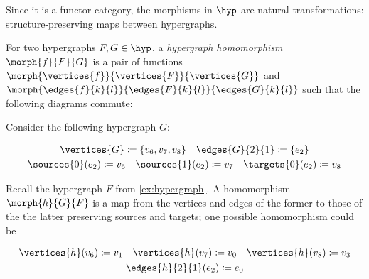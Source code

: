 Since it is a functor category, the morphisms in \(\hyp\) are natural
transformations: structure-preserving maps between hypergraphs.

\begin{definition}\label{def:hypergraph-homomorphism}
    For two hypergraphs \(F, G \in \hyp\), a \emph{hypergraph homomorphism}
    \(\morph{f}{F}{G}\) is a pair of functions
    \(\morph{\vertices{f}}{\vertices{F}}{\vertices{G}}\) and
    \(\morph{\edges{f}{k}{l}}{\edges{F}{k}{l}}{\edges{G}{k}{l}}\) such that the
    following diagrams commute:
    
\end{definition}
%
\begin{example}\label{ex:hypergraph-homomorphism}
    Consider the following hypergraph \(G\):
    \begin{center}
        \vspace{-\parskip}
        \begin{minipage}{0.75\textwidth}
            \begin{gather*}
                \vertices{G} \coloneqq \{v_6,v_7,v_8\}
                \quad
                \edges{G}{2}{1} \coloneqq \{e_2\}
                \\
                \sources{0}(e_2) \coloneqq v_6
                \quad
                \sources{1}(e_2) \coloneqq v_7
                \quad
                \targets{0}(e_2) \coloneqq v_8
            \end{gather*}
        \end{minipage}
        \begin{minipage}{0.2\textwidth}
            \centering

            \vspace{1.5em}

        \end{minipage}
    \end{center}

    Recall the hypergraph \(F\) from \cref{ex:hypergraph}.
    A homomorphism \(\morph{h}{G}{F}\) is a map from the vertices and edges
    of the former to those of the the latter preserving sources and targets;
    one possible homomorphism could be
    \begin{center}
        \begin{minipage}{0.75\textwidth}
            \begin{gather*}
                \vertices{h}(v_6) \coloneqq v_1
                \quad
                \vertices{h}(v_7) \coloneqq v_0
                \quad
                \vertices{h}(v_8) \coloneqq v_3
                \\
                \edges{h}{2}{1}(e_2) \coloneqq e_0
            \end{gather*}
        \end{minipage}
        \begin{minipage}{0.2\textwidth}
            \centering


\end{minipage}
\end{center}
\end{example}
